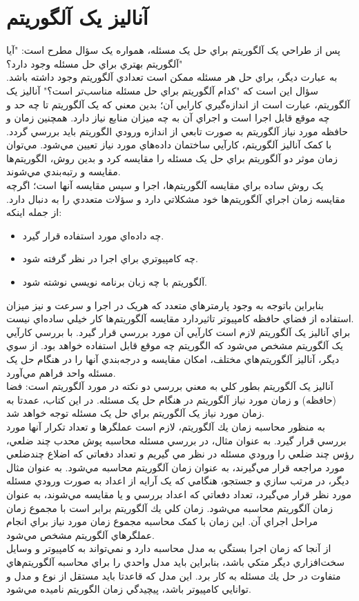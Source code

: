 \documentclass{book}
\begin{document}
\section*{آنالیز یک آلگوریتم}
پس از طراحي يک آلگوريتم براي حل يک مسئله، همواره يک سؤال مطرح است: "آيا آلگوريتم بهتري براي حل مسئله وجود دارد؟" \\
به عبارت ديگر، براي حل هر مسئله ممکن است تعدادي آلگوريتم وجود داشته باشد. سؤال اين است که "کدام آلگوريتم براي حل مسئله مناسب‌تر است؟"
آناليز يک آلگوريتم، عبارت است از اندازه‌گيري کارايي آن؛ بدين معني که يک آلگوريتم تا چه حد و چه موقع قابل اجرا است و اجراي آن به چه ميزان منابع نياز دارد. همچنين زمان و حافظه مورد نياز آلگوريتم به صورت تابعي از اندازه ورودي الگوريتم بايد بررسي گردد. با کمک آناليز آلگوريتم، کارآيي ساختمان داده‌هاي مورد نياز تعيين مي‌شود. مي‌توان زمان موثر دو آلگوريتم براي حل يک مسئله را مقايسه کرد و بدين روش، الگوريتم‌ها مقايسه و رتبه‌بندي مي‌شوند.\\
يک روش ساده براي مقايسه آلگوريتم‌ها، اجرا و سپس مقايسه آنها است؛ اگرچه مقايسه زمان اجراي آلگوريتم‌ها خود مشکلاتي دارد و سؤلات متعددي را به دنبال دارد. از جمله اينکه:\\
\begin{itemize}
	\item 
	چه داده‌اي مورد استفاده قرار گيرد.
	\item 
	چه کامپيوتري براي اجرا در نظر گرفته شود.
	\item 
	آلگوريتم با چه زبان برنامه نويسي نوشته شود.
\end{itemize}
بنابراين باتوجه به وجود پارمترهاي متعدد که هريک در اجرا و سرعت و نيز ميزان استفاده از فضاي حافظه کامپيوتر تاثيردارد مقايسه آلگوريتم‌ها کار خيلي ساده‌اي نيست.	\\

براي آناليز يک آلگوريتم لازم است کارآيي آن مورد بررسي قرار گيرد. با بررسي کارآيي يک آلگوريتم مشخص مي‌شود که الگوريتم چه موقع قابل استفاده خواهد بود. از سوي ديگر، آناليز آلگوريتم‌هاي مختلف، امکان مقايسه و درجه‌بندي آنها را در هنگام حل يک مسئله واحد فراهم مي‌آورد.\\
آناليز يک آلگوريتم بطور کلي به معني بررسي دو نکته در مورد آلگوريتم است: فضا (حافظه) و زمان مورد نياز آلگوريتم در هنگام حل يک مسئله. در اين کتاب، عمدتا به  زمان مورد نياز يک آلگوريتم براي حل يک مسئله توجه خواهد شد.\\
به منظور محاسبه زمان يك آلگوريتم، لازم است عملگرها و تعداد تكرار آنها مورد بررسي قرار گيرد. به عنوان مثال، در بررسي مسئله محاسبه پوش محدب چند ضلعي، رؤس چند ضلعي را ورودي مسئله در نظر مي گيريم و تعداد دفعاتي كه اضلاع چندضلعي مورد مراجعه قرار مي‌گيرند، به عنوان زمان آلگوريتم محاسبه مي‌شود. به عنوان مثال ديگر، در مرتب سازي و جستجو، هنگامي که يک آرايه از اعداد به صورت ورودي مسئله مورد نظر قرار مي‌گيرد، تعداد دفعاتي که اعداد بررسي و يا مقايسه مي‌شوند، به عنوان زمان آلگوريتم محاسبه مي‌شود. زمان كلي يك آلگوريتم برابر است با مجموع زمان مراحل اجراي آن. اين زمان با کمک محاسبه مجموع زمان مورد نياز براي انجام عملگرهاي آلگوريتم مشخص مي‌شود.\\
از آنجا كه زمان اجرا بستگي به مدل محاسبه دارد و نمي‌تواند به کامپيوتر و وسايل سخت‌افزاري ديگر متکي باشد، بنابراين بايد مدل واحدي را براي محاسبه آلگوريتم‌هاي متفاوت در حل يك مسئله به كار برد.  اين مدل که قاعدتا بايد مستقل از نوع و مدل و توانايي کامپيوتر باشد، پيچيدگي زمان الگوريتم ناميده مي‌شود.
\end{document}
